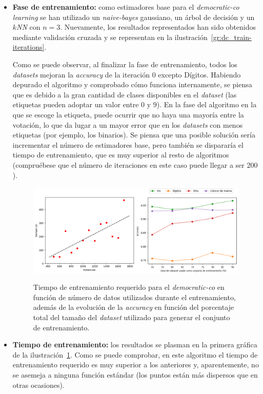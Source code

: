\begin{itemize}
	\item \textbf{Fase de entrenamiento:} como estimadores base para el \textit{democratic-co learning} se han utilizado un \textit{naive-bayes} gaussiano, un árbol de decisión y un \textit{$k$NN} con $n = 3$. Nuevamente, los resultados representados han sido obtenidos mediante validación cruzada y se representan en la ilustración~\ref{gr:dc_train-iterations}.
	
	Como se puede observar, al finalizar la fase de entrenamiento, todos los \textit{datasets} mejoran la \textit{accuracy} de la iteración 0 excepto Dígitos. Habiendo depurado el algoritmo y comprobado cómo funciona internamente, se piensa que es debido a la gran cantidad de clases disponibles en el \textit{dataset} (las etiquetas pueden adoptar un valor entre $0$ y $9$). En la fase del algoritmo en la que se escoge la etiqueta, puede ocurrir que no haya una mayoría entre la votación, lo que da lugar a un mayor error que en los \textit{datasets} con menos etiquetas (por ejemplo, los binarios). Se piensa que una posible solución sería incrementar el número de estimadores base, pero también se dispararía el tiempo de entrenamiento, que es muy superior al resto de algoritmos (compruébese que el número de iteraciones en este caso puede llegar a ser $200$).
	
\begin{figure}[h]
	\caption[\textit{Democratic-co}: resultados (tiempo-porcentaje)]{Tiempo de entrenamiento requerido para el \textit{democratic-co} en función de número de datos utilizados durante el entrenamiento, además de la evolución de la \textit{accuracy} en función del porcentaje total del tamaño del \textit{dataset} utilizado para generar el conjunto de entrenamiento.}
	\centering
	\includegraphics[scale=0.4]{../img/memoria/5_democraticco_time-percentage}
	\label{gr:dc_time-percentage}
\end{figure}
	
	\item \textbf{Tiempo de entrenamiento:} los resultados se plasman en la primera gráfica de la ilustración~\ref{gr:dc_time-percentage}. Como se puede comprobar, en este algoritmo el tiempo de entrenamiento requerido es muy superior a los anteriores y, aparentemente, no se asemeja a ninguna función estándar (los puntos están más dispersos que en otras ocasiones).
	

\end{itemize}

